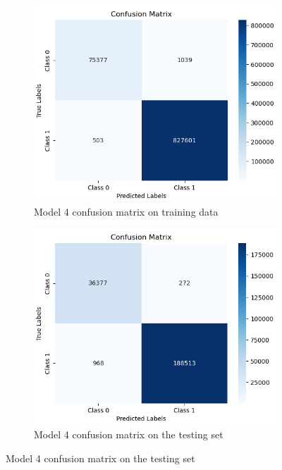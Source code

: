 \begin{figure}[H]%
    \centering
    \begin{subfigure}{0.49\textwidth}
        \centering
        \includegraphics[width=\linewidth]{figures/ev/do_1_cm1.png}
        \caption{Model 4 confusion matrix on training data}
    \label{fig:do_1_cm1}
    \end{subfigure}
    \begin{subfigure}{0.49\textwidth}
        \centering
         \includegraphics[width=\linewidth]{figures/ev/do_1_cm2.png}
        \caption{Model 4 confusion matrix on the testing set}

\end{subfigure}
\end{figure}

